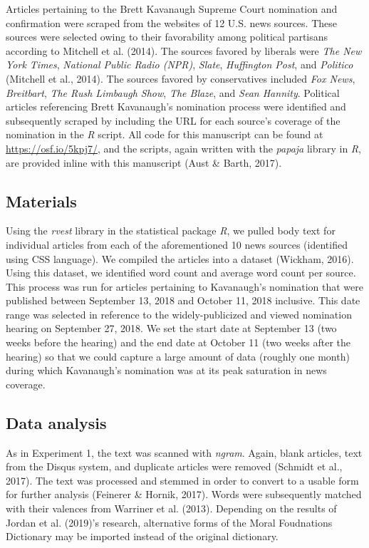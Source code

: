 \documentclass[,man]{apa6}
\begin{document}
Articles pertaining to the Brett Kavanaugh Supreme Court nomination and
confirmation were scraped from the websites of 12 U.S. news sources.
These sources were selected owing to their favorability among political
partisans according to Mitchell et al. (2014). The sources favored by
liberals were \emph{The New York Times}, \emph{National Public Radio
(NPR)}, \emph{Slate}, \emph{Huffington Post}, and \emph{Politico}
(Mitchell et al., 2014). The sources favored by conservatives included
\emph{Fox News}, \emph{Breitbart}, \emph{The Rush Limbaugh Show},
\emph{The Blaze}, and \emph{Sean Hannity}. Political articles
referencing Brett Kavanaugh's nomination process were identified and
subsequently scraped by including the URL for each source's coverage of
the nomination in the \emph{R} script. All code for this manuscript can
be found at \url{https://osf.io/5kpj7/}, and the scripts, again written
with the \emph{papaja} library in \emph{R}, are provided inline with
this manuscript (Aust \& Barth, 2017).

\subsection{Materials}\label{materials-1}

Using the \emph{rvest} library in the statistical package \emph{R}, we
pulled body text for individual articles from each of the aforementioned
10 news sources (identified using CSS language). We compiled the
articles into a dataset (Wickham, 2016). Using this dataset, we
identified word count and average word count per source. This process
was run for articles pertaining to Kavanaugh's nomination that were
published between September 13, 2018 and October 11, 2018 inclusive.
This date range was selected in reference to the widely-publicized and
viewed nomination hearing on September 27, 2018. We set the start date
at September 13 (two weeks before the hearing) and the end date at
October 11 (two weeks after the hearing) so that we could capture a
large amount of data (roughly one month) during which Kavanaugh's
nomination was at its peak saturation in news coverage.

\subsection{Data analysis}\label{data-analysis-1}

As in Experiment 1, the text was scanned with \emph{ngram}. Again, blank
articles, text from the Disqus system, and duplicate articles were
removed (Schmidt et al., 2017). The text was processed and stemmed in
order to convert to a usable form for further analysis (Feinerer \&
Hornik, 2017). Words were subsequently matched with their valences from
Warriner et al. (2013). Depending on the results of Jordan et al.
(2019)'s research, alternative forms of the Moral Foudnations Dictionary
may be imported instead of the original dictionary.
\end{document}
